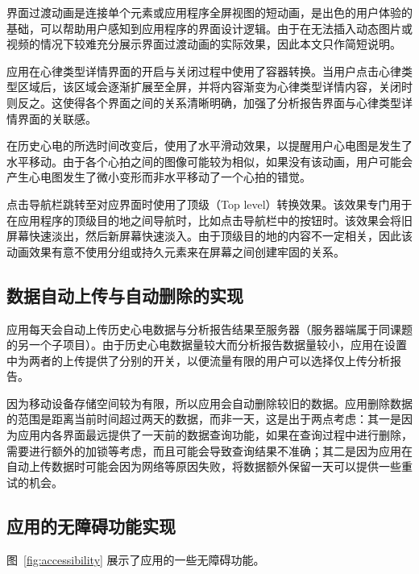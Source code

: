 界面过渡动画是连接单个元素或应用程序全屏视图的短动画，是出色的用户体验的基础，可以帮助用户感知到应用程序的界面设计逻辑。由于在无法插入动态图片或视频的情况下较难充分展示界面过渡动画的实际效果，因此本文只作简短说明。

应用在心律类型详情界面的开启与关闭过程中使用了容器转换。当用户点击心律类型区域后，该区域会逐渐扩展至全屏，并将内容渐变为心律类型详情内容，关闭时则反之。这使得各个界面之间的关系清晰明确，加强了分析报告界面与心律类型详情界面的关联感。

在历史心电的所选时间改变后，使用了水平滑动效果，以提醒用户心电图是发生了水平移动。由于各个心拍之间的图像可能较为相似，如果没有该动画，用户可能会产生心电图发生了微小变形而非水平移动了一个心拍的错觉。

点击导航栏跳转至对应界面时使用了顶级（Top level）转换效果。该效果专门用于在应用程序的顶级目的地之间导航时，比如点击导航栏中的按钮时。该效果会将旧屏幕快速淡出，然后新屏幕快速淡入。由于顶级目的地的内容不一定相关，因此该动画效果有意不使用分组或持久元素来在屏幕之间创建牢固的关系。


\subsection{数据自动上传与自动删除的实现}\label{subsec:data-auto-ui}

应用每天会自动上传历史心电数据与分析报告结果至服务器（服务器端属于同课题的另一个子项目）。由于历史心电数据量较大而分析报告数据量较小，应用在设置中为两者的上传提供了分别的开关，以便流量有限的用户可以选择仅上传分析报告。

因为移动设备存储空间较为有限，所以应用会自动删除较旧的数据。应用删除数据的范围是距离当前时间超过两天的数据，而非一天，这是出于两点考虑：其一是因为应用内各界面最远提供了一天前的数据查询功能，如果在查询过程中进行删除，需要进行额外的加锁等考虑，而且可能会导致查询结果不准确；其二是因为应用在自动上传数据时可能会因为网络等原因失败，将数据额外保留一天可以提供一些重试的机会。


\subsection{应用的无障碍功能实现}\label{subsec:accessibility-ui}

图~\ref{fig:accessibility} 展示了应用的一些无障碍功能。

